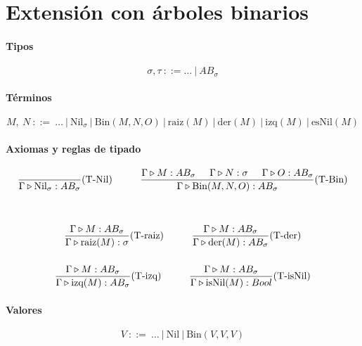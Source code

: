 \documentclass[10pt,a4paper]{article}
\begin{document}
\newpage
\section{Extensión con árboles binarios}

\paragraph{Tipos}
$$\sigma,\tau~::= \dots~|~AB_\sigma$$

\paragraph{Términos}
$$M,~N~::=~\dots~|~\text{Nil}_\sigma~|~\text{Bin}(M, N, O)~|~\text{raiz}(M)~|~\text{der}(M)~|~\text{izq}(M)~|~\text{esNil}(M)$$
\paragraph{Axiomas y reglas de tipado}
\begin{equation*}
\begin{gathered}
    \frac{}{\judgeType{\Gamma}{\text{Nil}_\sigma}{AB_\sigma}}(\text{T-Nil})\hspace*{1cm}
\frac{\judgeType{\Gamma}{M}{AB_\sigma}\hspace*{5mm}\judgeType{\Gamma}{N}{\sigma}\hspace*{5mm}\judgeType{\Gamma}{O}{AB_\sigma}}{\judgeType{\Gamma}{\text{Bin}(M, N, O)}{AB_\sigma}}(\text{T-Bin}) \\
\vspace*{5mm}\\
\frac{\judgeType{\Gamma}{M}{AB_\sigma}}{\judgeType{\Gamma}{\text{raiz}(M)}{\sigma}}(\text{T-raiz})\hspace*{1cm}
\frac{\judgeType{\Gamma}{M}{AB_\sigma}}{\judgeType{\Gamma}{\text{der}(M)}{AB_\sigma}}(\text{T-der})
\vspace*{5mm} \\
\frac{\judgeType{\Gamma}{M}{AB_\sigma}}{\judgeType{\Gamma}{\text{izq}(M)}{AB_\sigma}}(\text{T-izq})
\hspace*{1cm}
\frac{\judgeType{\Gamma}{M}{AB_\sigma}}{\judgeType{\Gamma}{\text{isNil}(M)}{Bool}}(\text{T-isNil})
\end{gathered}
\end{equation*}

\paragraph{Valores}
$$V~::=~\dots~|~\text{Nil}~|~\text{Bin}(V,V,V)$$
\end{document}
